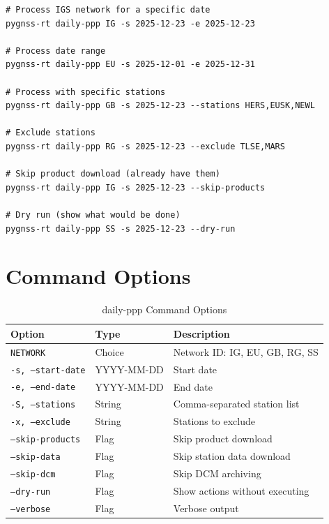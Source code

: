 \documentclass[11pt,a4paper,twoside]{report}
\newcommand{\code}[1]{\texttt{\small\color{primaryblue}#1}}
\begin{document}
\begin{lstlisting}[style=bashstyle, caption={Daily PPP Command Examples}, label={lst:daily-ppp}]
# Process IGS network for a specific date
pygnss-rt daily-ppp IG -s 2025-12-23 -e 2025-12-23

# Process date range
pygnss-rt daily-ppp EU -s 2025-12-01 -e 2025-12-31

# Process with specific stations
pygnss-rt daily-ppp GB -s 2025-12-23 --stations HERS,EUSK,NEWL

# Exclude stations
pygnss-rt daily-ppp RG -s 2025-12-23 --exclude TLSE,MARS

# Skip product download (already have them)
pygnss-rt daily-ppp IG -s 2025-12-23 --skip-products

# Dry run (show what would be done)
pygnss-rt daily-ppp SS -s 2025-12-23 --dry-run
\end{lstlisting}

\section{Command Options}

\begin{table}[H]
\centering
\caption{daily-ppp Command Options}
\label{tab:dailyppp-options}
\begin{tabular}{@{}llp{5cm}@{}}
\toprule
\textbf{Option} & \textbf{Type} & \textbf{Description} \\
\midrule
\code{NETWORK} & Choice & Network ID: IG, EU, GB, RG, SS \\
\code{-s, --start-date} & YYYY-MM-DD & Start date \\
\code{-e, --end-date} & YYYY-MM-DD & End date \\
\code{-S, --stations} & String & Comma-separated station list \\
\code{-x, --exclude} & String & Stations to exclude \\
\code{--skip-products} & Flag & Skip product download \\
\code{--skip-data} & Flag & Skip station data download \\
\code{--skip-dcm} & Flag & Skip DCM archiving \\
\code{--dry-run} & Flag & Show actions without executing \\
\code{--verbose} & Flag & Verbose output \\
\bottomrule
\end{tabular}
\end{table}
\end{document}
